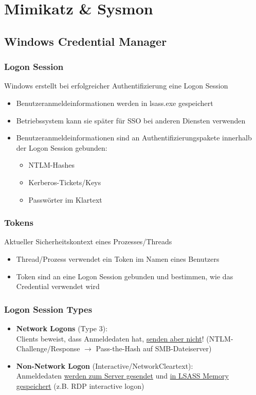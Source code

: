 

\section{Mimikatz \& Sysmon}

\subsection{Windows Credential Manager}

\subsubsection{Logon Session}
Windows erstellt bei erfolgreicher Authentifizierung eine Logon Session
\begin{itemize}
    \item Benutzeranmeldeinformationen werden in lsass.exe gespeichert
    \item Betriebssystem kann sie später für SSO bei anderen Diensten verwenden
    \item Benutzeranmeldeinformationen sind an Authentifizierungspakete innerhalb der Logon Session gebunden:
    \begin{itemize}
        \item NTLM-Hashes
        \item Kerberos-Tickets/Keys
        \item Passwörter im Klartext
    \end{itemize}
\end{itemize}

\subsubsection{Tokens}
Aktueller Sicherheitskontext eines Prozesses/Threads
\begin{itemize}
    \item Thread/Prozess verwendet ein Token im Namen eines Benutzers
    \item Token sind an eine Logon Session gebunden und bestimmen, wie das Credential verwendet wird
\end{itemize}

\subsubsection{Logon Session Types}
\begin{itemize}
    \item \textbf{Network Logons} (Type 3):\\
    Clients beweist, dass Anmeldedaten hat, \underline{senden aber nicht}! (NTLM-Challenge/Response $\rightarrow$ Pass-the-Hash auf SMB-Dateiserver)
    \item \textbf{Non-Network Logon} (Interactive/NetworkCleartext):\\
    Anmeldedaten \underline{werden zum Server gesendet} und \underline{in LSASS Memory} \underline{gespeichert} (z.B. RDP interactive logon)
\end{itemize}

